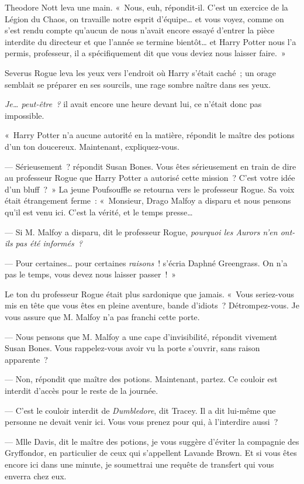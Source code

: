 Theodore Nott leva une main.
«~Nous, euh, répondit-il.
C'est un exercice de la Légion du Chaos, on travaille notre esprit d'équipe… et vous voyez, comme on s'est rendu compte qu'aucun de nous n'avait encore essayé d'entrer la pièce interdite du directeur et que l'année se termine bientôt… et Harry Potter nous l'a permis, professeur, il a spécifiquement dit que vous deviez nous laisser faire.~»

Severus Rogue leva les yeux vers l'endroit où Harry s'était caché~; un orage semblait se préparer en ses sourcils, une rage sombre naître dans ses yeux.

\emph{Je… peut-être~?} il avait encore une heure devant lui, ce n'était donc pas impossible.

«~Harry Potter n'a aucune autorité en la matière, répondit le maître des potions d'un ton doucereux.
Maintenant, expliquez-vous.

--- Sérieusement~? répondit Susan Bones.
Vous êtes sérieusement en train de dire au professeur Rogue que Harry Potter a autorisé cette mission~?
C'est votre idée d'un bluff~?~»
La jeune Poufsouffle se retourna vers le professeur Rogue.
Sa voix était étrangement ferme~: «~Monsieur, Drago Malfoy a disparu et nous pensons qu'il est venu ici.
C'est la vérité, et le temps presse…

--- Si M. Malfoy a disparu, dit le professeur Rogue, \emph{pourquoi les Aurors n'en ont-ils pas été informés~?}

--- Pour certaines… pour certaines \emph{raisons}~! s'écria Daphné Greengrass.
On n'a pas le temps, vous devez nous laisser passer~!~»

Le ton du professeur Rogue était plus sardonique que jamais.
«~Vous seriez-vous mis en tête que vous êtes en pleine aventure, bande d'idiots~?
Détrompez-vous.
Je vous assure que M. Malfoy n'a pas franchi cette porte.

--- Nous pensons que M. Malfoy a une cape d'invisibilité, répondit vivement Susan Bones.
Vous rappelez-vous avoir vu la porte s'ouvrir, sans raison apparente~?

--- Non, répondit que maître des potions.
Maintenant, partez.
Ce couloir est interdit d'accès pour le reste de la journée.

--- C'est le couloir interdit de \emph{Dumbledore}, dit Tracey.
Il a dit lui-même que personne ne devait venir ici.
Vous vous prenez pour qui, à l'interdire aussi~?

--- Mlle Davis, dit le maître des potions, je vous suggère d'éviter la compagnie des Gryffondor, en particulier de ceux qui s'appellent Lavande Brown.
Et si vous êtes encore ici dans une minute, je soumettrai une requête de transfert qui vous enverra chez eux.

